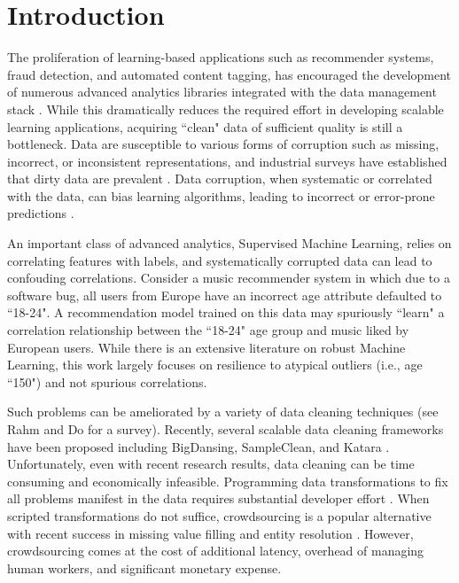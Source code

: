 \section{Introduction}
The proliferation of learning-based applications such as recommender systems, fraud detection, and automated content tagging, has encouraged the development of numerous advanced analytics libraries integrated with the data management stack \cite{bdas, alexandrov2014stratosphere, crotty2014tupleware, hellerstein2012madlib}. 
While this dramatically reduces the required effort in developing scalable learning applications, acquiring ``clean" data of sufficient quality is still a bottleneck.
Data are susceptible to various forms of corruption such as missing, incorrect, or inconsistent representations, and industrial surveys have established that dirty data are prevalent  \cite{Gartner}.
Data corruption, when systematic or correlated with the data\cite{taylor1982introduction}, can bias learning algorithms, leading to incorrect or error-prone predictions \cite{xiaofeature}.

An important class of advanced analytics, Supervised Machine Learning, relies on correlating features with labels, and systematically corrupted data can lead to confouding correlations.
Consider a music recommender system in which due to a software bug, all users from Europe have an incorrect age attribute defaulted to ``18-24".
A recommendation model trained on this data may spuriously ``learn" a correlation relationship between the ``18-24" age group and music liked by European users.
While there is an extensive literature on robust Machine Learning, this work largely focuses on resilience to atypical outliers (i.e., age ``150") and not spurious correlations.

Such problems can be ameliorated by a variety of data cleaning techniques (see Rahm and Do \cite{rahm2000data} for a survey).
Recently, several scalable data cleaning frameworks have been proposed including BigDansing\cite{khayyat2015bigdansing}, SampleClean\cite{sampleclean}, and Katara \cite{chu2015katara}. 
Unfortunately, even with recent research results, data cleaning can be time consuming and economically infeasible\cite{wang1999sample}.
Programming data transformations to fix all problems manifest in the data requires substantial developer effort \cite{kandel2012}.
When scripted transformations do not suffice, crowdsourcing is a popular alternative with recent success in missing value filling and entity resolution \cite{gokhale2014corleone, park2014crowdfill, sampleclean,chu2015katara}.
However, crowdsourcing comes at the cost of additional latency, overhead of managing human workers, and significant monetary expense.

